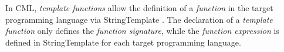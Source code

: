 In CML, \emph{template functions}
allow the definition of a \emph{function} in the target programming language
via StringTemplate \cite{st}.
The declaration of a \emph{template function} only defines
the \emph{function signature},
while the \emph{function expression} is defined in StringTemplate
for each target programming language.
